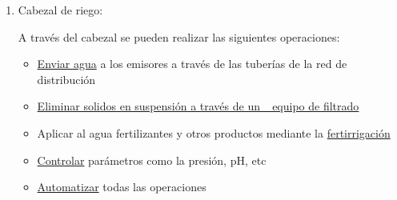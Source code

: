 \documentclass[a4paper,12pt,oneside]{article}
\begin{document}
\begin{enumerate}
\item Cabezal de riego:
\label{sec:org016d02a}

A través del cabezal se pueden realizar las siguientes operaciones:\\
\begin{itemize}
\item \uline{Enviar agua} a los emisores a través de las tuberías de la red de
distribución
\item \uline{Eliminar solidos en suspensión a través de un \_equipo de filtrado}
\item Aplicar al agua fertilizantes y otros productos mediante la \uline{fertirrigación}
\item \uline{Controlar} parámetros como la presión, pH, etc
\item \uline{Automatizar} todas las operaciones
\end{itemize}


\end{enumerate}
\end{document}
